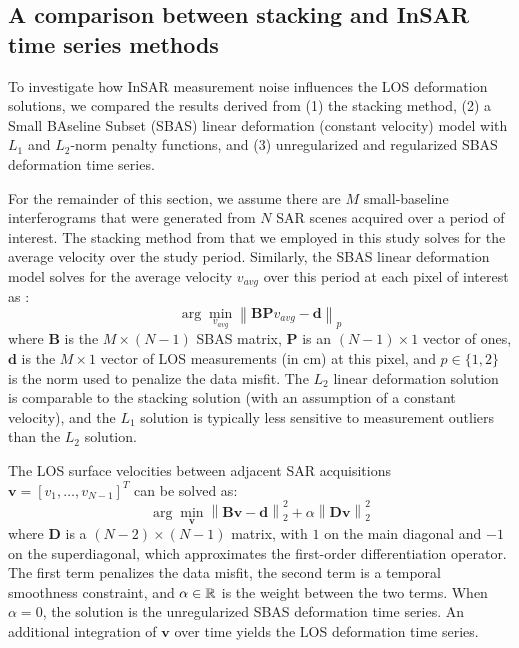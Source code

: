 \documentclass{utexasthesis}
\newcommand{\norm}[1]{\left\lVert#1\right\rVert}
\begin{document}
\subsection{A comparison between stacking and InSAR time series methods}
\label{sec:method-compare}
To investigate how InSAR measurement noise influences the LOS deformation solutions, we compared the results derived from (1) the stacking method, (2) a Small BAseline Subset (SBAS) linear deformation (constant velocity) model with $L_1$ and $L_2$-norm penalty functions, and (3) unregularized and regularized SBAS deformation time series. 

For the remainder of this section, we assume there are $M$ small-baseline interferograms that were generated from $N$ SAR scenes acquired over a period of interest. The stacking method from \cite{Sandwell1998PhaseGradientApproach} that we employed in this study solves for the average velocity over the study period. Similarly, the SBAS linear deformation model solves for the average velocity $ v_{avg} $ over this period at each pixel of interest as \citep{Berardino2002NewAlgorithmSurface}:
\begin{equation}
	\arg \min_{v_{avg}} \norm{ \bm{BP} v_{avg} - \bm{d}   }_p
	\label{eq:sbas-linear}
\end{equation}
where $ \bm{B }$ is the $ M \times (N-1) $ SBAS matrix, $ \bm{P}$ is an $ (N-1) \times 1 $ vector of ones, $ \bm{d} $ is the $ M \times 1 $ vector of LOS measurements (in cm) at this pixel, and $ p \in \{1, 2\} $ is the norm used to penalize the data misfit. The $L_2$ linear deformation solution is comparable to the stacking solution (with an assumption of a constant velocity), and the $L_1$ solution is typically less sensitive to measurement outliers than the $L_2$ solution.

The LOS surface velocities between adjacent SAR acquisitions $ \bm{v} = \left[v_1 , \ldots , v_{N-1} \right]^T $ can be solved as:
\begin{equation}
	\arg \min_{\bm{v} } \norm{ \bm{Bv} - \bm{d}   }^2_2 + \alpha \norm{ \bm{Dv} }^2_2  \label{eq:sbas}
\end{equation}
where $ \bm{D} $ is a $ (N-2) \times (N-1) $ matrix, with $1$ on the main diagonal and $-1$ on the superdiagonal, which approximates the first-order differentiation operator. The first term penalizes the data misfit, the second term is a temporal smoothness constraint, and $ \alpha \in \Bbb{R} $ is the weight between the two terms. When $ \alpha = 0 $, the solution is the unregularized SBAS deformation time series. An additional integration of $\mathbf{v}$ over time yields the LOS deformation time series.
\end{document}
